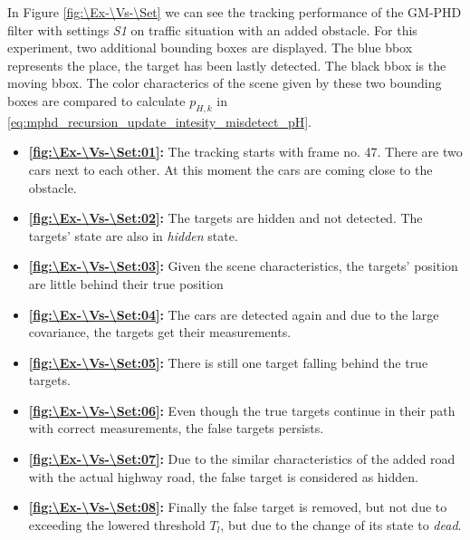 In Figure \ref{fig:\Ex-\Vs-\Set} we can see the tracking performance of the GM-PHD filter with settings \textit{S1} on traffic situation with an added obstacle. For this experiment, two additional bounding boxes are displayed. The blue bbox represents the place, the target has been lastly detected. The black bbox is the moving bbox. The color characterics of the scene given by these two bounding boxes are compared to calculate $p_{H,k}$ in \eqref{eq:mphd_recursion_update_intesity_misdetect_pH}.
\begin{itemize}
    \item \textbf{\ref{fig:\Ex-\Vs-\Set:01}:} The tracking starts with frame no. 47. There are two cars next to each other. At this moment the cars are coming close to the obstacle.
    \item \textbf{\ref{fig:\Ex-\Vs-\Set:02}:} The targets are hidden and not detected. The targets' state are also in \textit{hidden} state.
    \item \textbf{\ref{fig:\Ex-\Vs-\Set:03}:} Given the scene characteristics, the targets' position are little behind their true position
    \item \textbf{\ref{fig:\Ex-\Vs-\Set:04}:} The cars are detected again and due to the large covariance, the targets get their measurements.
    \item \textbf{\ref{fig:\Ex-\Vs-\Set:05}:} There is still one target falling behind the true targets.
    \item \textbf{\ref{fig:\Ex-\Vs-\Set:06}:} Even though the true targets continue in their path with correct measurements, the false targets persists.
    \item \textbf{\ref{fig:\Ex-\Vs-\Set:07}:} Due to the similar characteristics of the added road with the actual highway road, the false target is considered as hidden.
    \item \textbf{\ref{fig:\Ex-\Vs-\Set:08}:} Finally the false target is removed, but not due to exceeding the lowered threshold $T_l$, but due to the change of its state to \textit{dead}.
\end{itemize}

